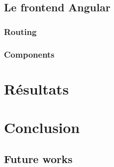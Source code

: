 \documentclass[11pt,a4paper]{report}
\begin{document}
\section{Le frontend Angular}
\subsection{Routing}
\subsection{Components}
\chapter{Résultats}
\chapter{Conclusion}
\section{Future works}


\end{document}
